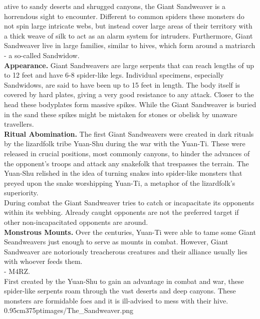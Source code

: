 \documentclass[10pt,openany,twoside,twocolumn]{book}
\begin{document}

\mainmatter%


\entryfont \noindent {}ative to sandy deserts and shrugged canyons, the Giant Sandweaver is a horrendous sight to encounter. Different to common spiders these monsters do not spin large intricate webs, but instead cover large areas of their territory with a thick weave of silk to act as an alarm system for intruders. Furthermore, Giant Sandweaver live in large families, similar to hives, which form around a matriarch - a so-called Sandwidow.\\
\textbf{Appearance.} Giant Sandweavers are large serpents that can reach lengths of up to 12 feet and have 6-8 spider-like legs. Individual specimens, especially Sandwidows, are said to have been up to 15 feet in length. The body itself is covered by hard plates, giving a very good resistance to any attack. Closer to the head these bodyplates form massive spikes. While the Giant Sandweaver is buried in the sand these spikes might be mistaken for stones or obelisk by unaware travellers.\\
\textbf{Ritual Abomination.} The first Giant Sandweavers were created in dark rituals by the lizardfolk tribe Yuan-Shu during the war with the Yuan-Ti. These were released in crucial positions, most commonly canyons, to hinder the advances of the opponent's troops and attack any snakefolk that trespasses the terrain. The Yuan-Shu relished in the idea of turning snakes into spider-like monsters that preyed upon the snake worshipping Yuan-Ti, a metaphor of the lizardfolk's superiority.\\
During combat the Giant Sandweaver tries to catch or incapacitate its opponents within its webbing. Already caught opponents are not the preferred target if other non-incapacitated opponents are around.\\
\textbf{Monstrous Mounts.} Over the centuries, Yuan-Ti were able to tame some Giant Seandweavers just enough to serve as mounts in combat. However, Giant Sandweaver are notoriously treacherous creatures and their alliance usually lies with whoever feeds them.\\
- M4RZ.\\

%
{%
	First created by the Yuan-Shu to gain an advantage in combat and war, these spider-like serpents roam through the vast deserts and deep canyons. These monsters are formidable foes and it is ill-advised to mess with their hive.%
}{0.95cm}{375pt}{images/The_Sandweaver.png}%
\end{document}
